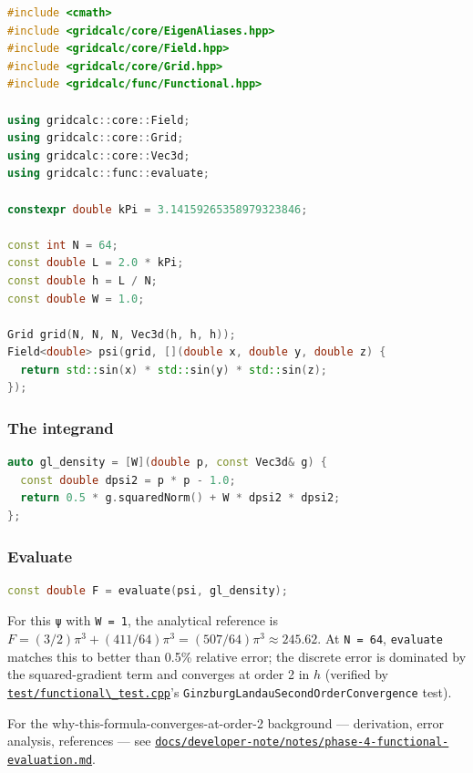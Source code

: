 \begin{lstlisting}[language={C++}]
#include <cmath>
#include <gridcalc/core/EigenAliases.hpp>
#include <gridcalc/core/Field.hpp>
#include <gridcalc/core/Grid.hpp>
#include <gridcalc/func/Functional.hpp>

using gridcalc::core::Field;
using gridcalc::core::Grid;
using gridcalc::core::Vec3d;
using gridcalc::func::evaluate;

constexpr double kPi = 3.14159265358979323846;

const int N = 64;
const double L = 2.0 * kPi;
const double h = L / N;
const double W = 1.0;

Grid grid(N, N, N, Vec3d(h, h, h));
Field<double> psi(grid, [](double x, double y, double z) {
  return std::sin(x) * std::sin(y) * std::sin(z);
});
\end{lstlisting}

\subsubsection{The integrand}\label{the-integrand}

\begin{lstlisting}[language={C++}]
auto gl_density = [W](double p, const Vec3d& g) {
  const double dpsi2 = p * p - 1.0;
  return 0.5 * g.squaredNorm() + W * dpsi2 * dpsi2;
};
\end{lstlisting}

\subsubsection{Evaluate}\label{evaluate}

\begin{lstlisting}[language={C++}]
const double F = evaluate(psi, gl_density);
\end{lstlisting}

For this \passthrough{\lstinline!ψ!} with
\passthrough{\lstinline!W = 1!}, the analytical reference is
\(F = (3/2)\pi^3 + (411/64)\pi^3 = (507/64)\pi^3 \approx 245.62\). At
\passthrough{\lstinline!N = 64!}, \passthrough{\lstinline!evaluate!}
matches this to better than 0.5\% relative error; the discrete error is
dominated by the squared-gradient term and converges at order 2 in \(h\)
(verified by
\href{../../../test/functional_test.cpp}{\passthrough{\lstinline!test/functional\_test.cpp!}}'s
\passthrough{\lstinline!GinzburgLandauSecondOrderConvergence!} test).

For the why-this-formula-converges-at-order-2 background --- derivation,
error analysis, references --- see
\href{../../developer-note/notes/phase-4-functional-evaluation.md}{\passthrough{\lstinline!docs/developer-note/notes/phase-4-functional-evaluation.md!}}.

